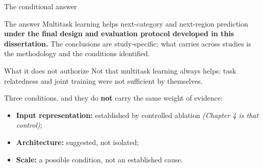 \documentclass{beamer}
\begin{document}
\begin{frame}{The conditional answer}
    \vspace{0pt}%
    {\footnotesize
    \begin{block}{The answer}
        Multitask learning helps next-category and next-region prediction \textbf{under the final
        design and evaluation protocol developed in this dissertation.} The conclusions are
        study-specific; what carries across studies is the methodology and the conditions
        identified.
    \end{block}

    \begin{alertblock}{What it does not authorize}
        Not that multitask learning always helps: task relatedness and joint training were
        \alert{not sufficient by themselves}.
    \end{alertblock}

    \vspace{1mm}
    Three conditions, and they do \textbf{not} carry the same weight of evidence:
    \begin{itemize}\setlength{\itemsep}{1pt}\setlength{\topsep}{2pt}
        \item \textbf{Input representation:} established by controlled ablation
              \emph{(Chapter 4 is that control)};
        \item \textbf{Architecture:} suggested, not isolated;
        \item \textbf{Scale:} \alert{a possible condition, not an established cause}.
    \end{itemize}\par}
\end{frame}
\end{document}

